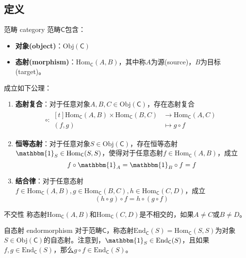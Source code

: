 \subsection{定义}

\begin{definition}{范畴 category}
	范畴$\mathsf{C}$包含：
	\begin{itemize}
		\item {\bf 对象(object)}：$\mathrm{Obj}(\mathsf{C})$
		\item {\bf 态射(morphism)}：$\mathrm{Hom}_\mathsf{C}(A,B)$，其中称$A$为源(source)，$B$为目标(target)。
	\end{itemize}
	成立如下公理：
	\begin{enumerate}
		\item {\bf 态射复合}：对于任意对象$A,B,C\in\mathrm{Obj}(\mathsf{C})$，存在态射复合
		\begin{align*}
			\circ :\begin{aligned}[t]
				\mathrm{Hom}_\mathsf{C}(A,B)\times \mathrm{Hom}_\mathsf{C}(B,C)&\longrightarrow \mathrm{Hom}_\mathsf{C}(A,C)\\
				(f,g)&\longmapsto g\circ f
			\end{aligned}
		\end{align*}
		\item {\bf 恒等态射}：对于任意对象$S\in\mathrm{Obj}(\mathsf{C})$，存在恒等态射$\mathbbm{1}_S\in\mathrm{Hom}_\mathsf{C}(S,S)$，使得对于任意态射$f\in \mathrm{Hom}_\mathsf{C}(A,B)$，成立
		$$
		f\circ\mathbbm{1}_A=\mathbbm{1}_B\circ f=f
		$$
		\item {\bf 结合律}：对于任意态射$f\in \mathrm{Hom}_\mathsf{C}(A,B),g\in \mathrm{Hom}_\mathsf{C}(B,C),h\in \mathrm{Hom}_\mathsf{C}(C,D)$，成立
		$$
		(h\circ g)\circ f=h\circ (g\circ f)
		$$
	\end{enumerate}
\end{definition}

\begin{definition}{不交性}
	称态射$\mathrm{Hom}_\mathsf{C}(A,B)$和$\mathrm{Hom}_\mathsf{C}(C,D)$是不相交的，如果$A\ne C$或$B\ne D$。
\end{definition}

\begin{definition}{自态射 endormorphism}
	对于范畴$\mathsf{C}$，称态射$\mathrm{End}_\mathsf{C}(S)=\mathrm{Hom}_\mathsf{C}(S,S)$为对象$S\in\mathrm{Obj}(\mathsf{C})$的自态射。注意到，$\mathbbm{1}_S\in \mathrm{End}_\mathsf{C}(S)$，且如果$f,g\in\mathrm{End}_\mathsf{C}(S)$，那么$g\circ f\in\mathrm{End}_\mathsf{C}(S)$。
\end{definition}

